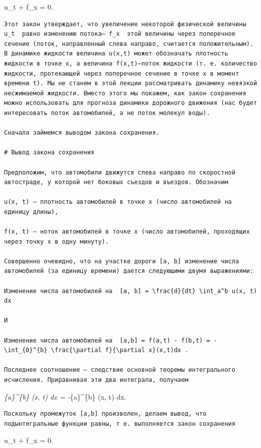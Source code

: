 \documentclass[
  ukrainian,
]{article}
\begin{document}
u\_t + f\_x = 0.

\begin{verbatim}
Этот закон утверждает, что увеличение некоторой физической величины  u_t  равно изменению потока— f_x  этой величины через поперечное сечение (поток, направленный слева направо, считается положительным). В динамике жидкости величина u(x,t) может обозначать плотность жидкости в точке x, а величина f(x,t)—поток жидкости (т. е. количество жидкости, протекающей через поперечное сечение в точке x в момент времени t). Мы не станем в этой лекции рассматривать динамику невязкой несжимаемой жидкости. Вместо этого мы покажем, как закон сохранения можно использовать для прогноза динамики дорожного движения (нас будет интересовать поток автомобилей, а не поток молекул воды).

Сначала займемся выводом закона сохранения.

# Вывод закона сохранения

Предположим, что автомобили движутся слева направо по скоростной автостраде, у которой нет боковых съездов и въездов. Обозначим

u(x, t) — плотность автомобилей в точке x (число автомобилей на единицу длины),

f(x, t) — ноток автомобилей в точке x (число автомобилей, проходящих через точку x в одну минуту).

Совершенно очевидно, что на участке дороги [a, b] изменение числа автомобилей (за единицу времени) дается следующими двумя выражениями:

Изменение числа автомобилей на  [a, b] = \frac{d}{dt} \int_a^b u(x, t) dx 

И

Изменение числа автомобилей на  [a,b] = f(a,t) - f(b,t) = -\int_{0}^{b} \frac{\partial f}{\partial x}(x,t)dx .

Последнее соотношение — следствие основной теоремы интегрального исчисления. Приравнивая эти два интеграла, получаем
\end{verbatim}

\int\emph{\{a\}\^{}\{b\} (x, t) dx =
-\int}\{a\}\^{}\{b\} (x, t) dx.

\begin{verbatim}
Поскольку промежуток [a,b] произволен, делаем вывод, что подынтегральные функции равны, т е. выполняется закон сохранения
\end{verbatim}

u\_t + f\_x = 0.
\end{document}

